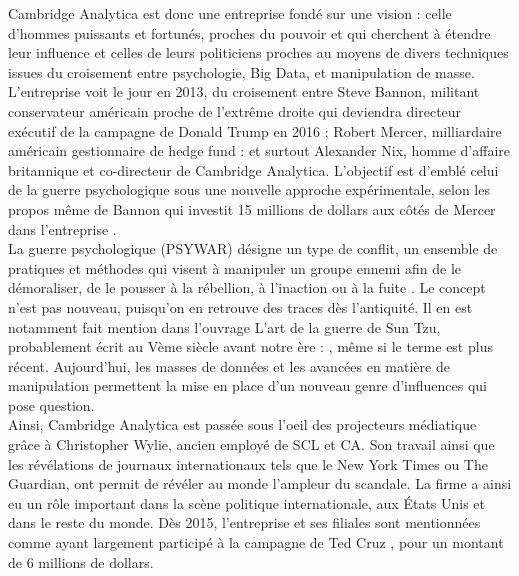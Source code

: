 \documentclass{article}
\begin{document}
Cambridge Analytica est donc une entreprise fondé sur une vision : celle d’hommes puissants et fortunés, proches du pouvoir et qui cherchent à étendre leur influence et celles de leurs politiciens proches au moyens de divers techniques issues du croisement entre psychologie, Big Data, et manipulation de masse. L’entreprise voit le jour en 2013, du croisement entre Steve Bannon, militant conservateur américain proche de l’extrême droite qui deviendra directeur exécutif de la campagne de Donald Trump en 2016 ; Robert Mercer, milliardaire américain gestionnaire de hedge fund : et surtout Alexander Nix, homme d’affaire britannique et co-directeur de Cambridge Analytica. L’objectif est d’emblé celui de la guerre psychologique sous une nouvelle approche expérimentale, selon les propos même de Bannon qui investit 15 millions de dollars aux côtés de Mercer dans l'entreprise \cite{Silver2018-rq}.\\

La guerre psychologique (PSYWAR) désigne un type de conflit, un ensemble de pratiques et méthodes qui visent à manipuler un groupe ennemi afin de le démoraliser, de le pousser à la rébellion, à l’inaction ou à la fuite \cite{Chaliand1992-mp}. Le concept n’est pas nouveau, puisqu’on en retrouve des traces dès l’antiquité. Il en est notamment fait mention dans l’ouvrage L’art de la guerre de Sun Tzu, probablement écrit au Vème siècle avant notre ère :  \cite{Tzu_undated-du}, même si le terme est plus récent. Aujourd’hui, les masses de données et les avancées en matière de manipulation permettent la mise en place d’un nouveau genre d’influences qui pose question.\\

Ainsi, Cambridge Analytica est passée sous l’oeil des projecteurs médiatique grâce à Christopher Wylie, ancien employé de SCL et CA. Son travail ainsi que les révélations de journaux internationaux tels que le New York Times ou The Guardian, ont permit de révéler au monde l’ampleur du scandale. La firme a ainsi eu un rôle important dans la scène politique internationale, aux États Unis et dans le reste du monde. Dès 2015, l’entreprise et ses filiales sont mentionnées comme ayant largement participé à la campagne de Ted Cruz \cite{Davies2015-wq}, pour un montant de 6 millions de dollars.\\
\end{document}
